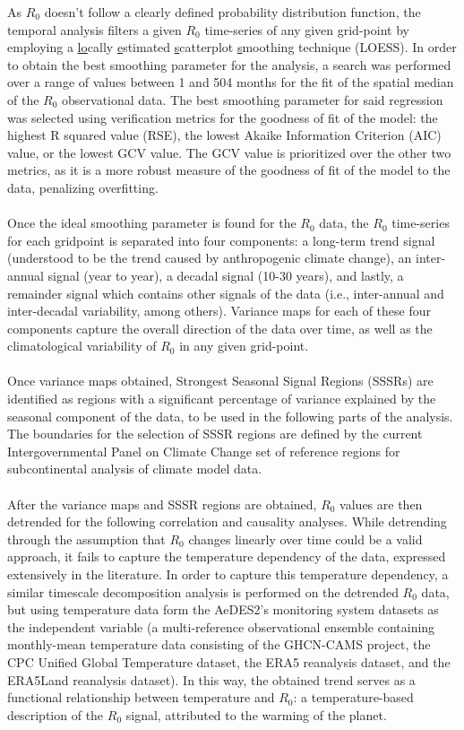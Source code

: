 \documentclass[article,10pt,twocolumn]{wlscirep}
\begin{document}
  As $R_0$ doesn't follow a clearly defined probability distribution function, the temporal analysis filters a given $R_0$ time-series of any given grid-point by employing a \underline{lo}cally \underline{e}stimated \underline{s}catterplot \underline{s}moothing technique (LOESS). In order to obtain the best smoothing parameter for the analysis, a search was performed over a range of values between 1 and 504 months for the fit of the spatial median of the $R_0$ observational data. The best smoothing parameter for said regression was selected using verification metrics for the goodness of fit of the model: the highest R squared value (RSE), the lowest Akaike Information Criterion (AIC) value, or the lowest GCV value. The GCV value is prioritized over the other two metrics, as it is a more robust measure of the goodness of fit of the model to the data, penalizing overfitting.
  \\
  \\
  Once the ideal smoothing parameter is found for the $R_0$ data, the $R_0$ time-series for each gridpoint is separated into four components: a long-term trend signal (understood to be the trend caused by anthropogenic climate change), an inter-annual signal (year to year), a decadal signal (10-30 years), and lastly, a remainder signal which contains other signals of the data (i.e., inter-annual and inter-decadal variability, among others). Variance maps for each of these four components capture the overall direction of the data over time, as well as the climatological variability of $R_0$ in any given grid-point. 
  \\
  \\
  Once variance maps obtained, Strongest Seasonal Signal Regions (SSSRs) are identified as regions with a significant percentage of variance explained by the seasonal component of the data, to be used in the following parts of the analysis. The boundaries for the selection of SSSR regions are defined by the current Intergovernmental Panel on Climate Change set of reference regions for subcontinental analysis of climate model data.
  \\
  \\
  After the variance maps and SSSR regions are obtained, $R_0$ values are then detrended for the following correlation and causality analyses. While detrending through the assumption that $R_0$ changes linearly over time could be a valid approach, it fails to capture the temperature dependency of the data, expressed extensively in the literature. In order to capture this temperature dependency, a similar timescale decomposition analysis is performed on the detrended $R_0$ data, but using temperature data form the AeDES2's monitoring system datasets as the independent variable (a multi-reference observational ensemble containing monthly-mean temperature data consisting of the GHCN-CAMS project, the CPC Unified Global Temperature dataset, the ERA5 reanalysis dataset, and the ERA5Land reanalysis dataset). In this way, the obtained trend serves as a functional relationship between temperature and $R_0$: a temperature-based description of the $R_0$ signal, attributed to the warming of the planet.
  
\end{document}
